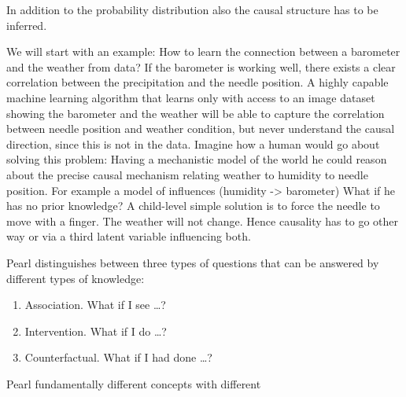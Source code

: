 		In addition to the probability distribution also the causal structure has to be inferred. 

		We will start with an example: How to learn the connection between a barometer and the weather from data? If the barometer is working well, there exists a clear correlation between the precipitation and the needle position.
		A highly capable machine learning algorithm that learns only with access to an image dataset showing the barometer and the weather will be able to capture the correlation between needle position and weather condition, but never understand the causal direction, since this is not in the data.
		Imagine how a human would go about solving this problem:
		Having a mechanistic model of the world he could reason about the precise causal mechanism relating weather to humidity to needle position. For example a model of influences (humidity -> barometer)
		What if he has no prior knowledge? A child-level simple solution is to force the needle to move with a finger. The weather will not change. Hence causality has to go other way or via a third latent variable influencing both.


		Pearl \cite{pearl18why} distinguishes between three types of questions that can be answered by different types of knowledge:
		\begin{enumerate}
			\item Association. What if I see \ldots?
			\item Intervention. What if I do \ldots?
			\item Counterfactual. What if I had done \ldots?
		\end{enumerate}
		Pearl fundamentally different concepts with different


